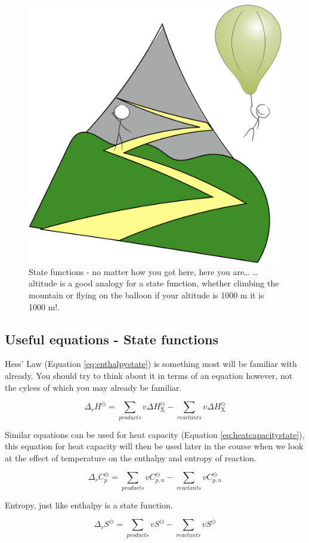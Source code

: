 \documentclass[
]{book}
\begin{document}
\begin{figure}

{\centering \includegraphics[width=0.3\linewidth]{images/mountain} 

}

\caption{State functions - no matter how you got here, here you are… …altitude is a good analogy for a state function, whether climbing the mountain or flying on the balloon if your altitude is 1000 m it is 1000 m!.}\label{fig:mountain}
\end{figure}

\hypertarget{sec:equations1}{%
\subsection{Useful equations - State functions}\label{sec:equations1}}

Hess' Law (Equation \eqref{eq:enthalpystate}) is something most will be familiar with already. You should try to think about it in terms of an equation however, not the cylces of which you may already be familiar.

\begin{equation}
\Delta_r H^{\ominus} = \sum_{products}v \Delta H^{\ominus}_\textrm{X}-\sum_{reactants}v \Delta H^{\ominus}_\textrm{X}
\label{eq:enthalpystate}
\end{equation}

Similar equations can be used for heat capacity (Equation \eqref{eq:heatcapacitystate}), this equation for heat capacity will then be used later in the course when we look at the effect of temperature on the enthalpy and entropy of reaction.

\begin{equation}
\Delta_r C_p^{\ominus} = \sum_{products}vC_{p,n}^{\ominus}-\sum_{reactants}vC_{p,n}^{\ominus}
\label{eq:heatcapacitystate}
\end{equation}

Entropy, just like enthalpy is a state function.

\begin{equation}
\Delta_r S^{\ominus} = \sum_{products}v S^{\ominus}-\sum_{reactants}v S^{\ominus}
\label{eq:entropystate}
\end{equation}
\end{document}
